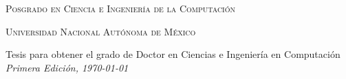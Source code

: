 \vfill
\thispagestyle{empty}

\noindent \textsc{Posgrado en Ciencia e Ingeniería de la Computación}

\noindent \textsc{Universidad Nacional Autónoma de México}

\vspace{1em}

\noindent Tesis para obtener el grado de Doctor en Ciencias e
Ingeniería en Computación\\
\noindent \textit{Primera Edición, \today}
